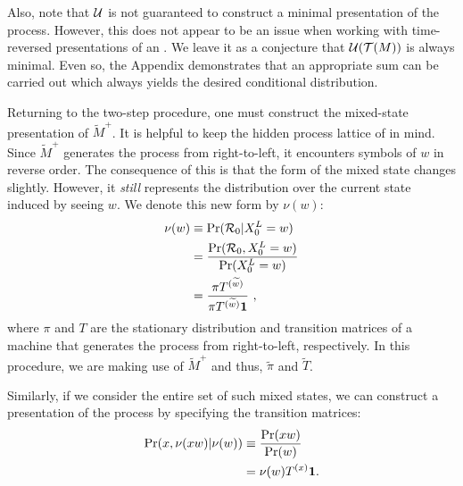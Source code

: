 Also, note that $\mathcal{U}$ is not guaranteed to construct a minimal presentation 
of the process. However, this does not appear to be an issue when working with
time-reversed presentations of an \eM. We leave it as a conjecture that
$\mathcal{U}(\mathcal{T}(M))$ is always minimal. Even so, the Appendix demonstrates that an
appropriate sum can be carried out which always yields the desired conditional
distribution.

Returning to the two-step procedure, one must construct the mixed-state 
presentation of $\widetilde{M}^+$. It is helpful to keep the hidden process 
lattice of  in mind.  Since $\widetilde{M}^+$ 
generates the process from right-to-left, it encounters symbols of $w$ in 
reverse order. The consequence of this is that the form of the mixed state 
changes slightly. However, it \textit{still} represents the distribution over
the current state induced by seeing $w$. We denote
this new form by $\nu(w)$:
\begin{align}
\label{mixedstatesrev}
\nu(w) &\equiv
    \Pr(\mathcal{R}_0 | {X}_0^L=w) \\
  & = 
\frac{\Pr(\mathcal{R}_0, {X}_0^L=w)}{\Pr({X}_0^L=w)} \\
  &= \frac{\pi T^{(\widetilde{w})}}
          {\pi T^{(\widetilde{w})}\mathbf{1}} ~,
\end{align}
where $\pi$ and $T$ are the stationary distribution and transition matrices of
a machine that generates the process from right-to-left, respectively. In this
procedure, we are making use of $\widetilde{M}^+$ and thus, $\widetilde{\pi}$
and $\widetilde{T}$.

Similarly, if we consider the entire set of such mixed states, we can construct 
a presentation of the process by specifying the transition matrices:
\begin{align}
\Pr({x}, \nu({x} w) | \nu(w))
	& \equiv \frac{\Pr(xw)}{\Pr(w)} \\
  & = \nu(w) T^{(x)} \mathbf{1}.
\label{transitionrev}
\end{align}

